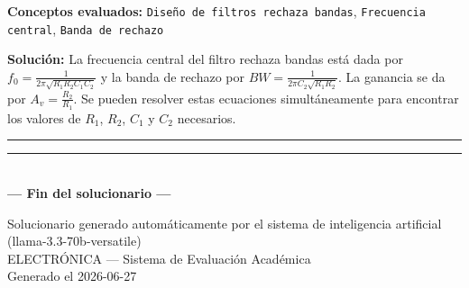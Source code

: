 \documentclass[11pt,a4paper]{article}
\begin{document}
\vspace{2mm}
\textbf{Conceptos evaluados:} \texttt{Diseño de filtros rechaza bandas}, \texttt{Frecuencia central}, \texttt{Banda de rechazo}

\vspace{2mm}
\textbf{Solución:}
La frecuencia central del filtro rechaza bandas está dada por $f_0 = \frac{1}{2\pi \sqrt{R_1 R_2 C_1 C_2}}$ y la banda de rechazo por $BW = \frac{1}{2\pi C_2 \sqrt{R_1 R_2}}$. La ganancia se da por $A_v = \frac{R_2}{R_1}$. Se pueden resolver estas ecuaciones simultáneamente para encontrar los valores de $R_1$, $R_2$, $C_1$ y $C_2$ necesarios.

\vspace{4pt}
\rule{\linewidth}{0.2pt}
\vspace{6pt}



\vspace{12pt}
\begin{center}
  \rule{0.6\linewidth}{0.4pt} \\[6pt]
  \textbf{--- Fin del solucionario ---}
\end{center}

\vfill
\begin{center}
  \footnotesize\color{gray}
  Solucionario generado automáticamente por el sistema de inteligencia artificial (llama-3.3-70b-versatile) \\
  ELECTRÓNICA --- Sistema de Evaluación Académica \\
  Generado el 2026-06-27
\end{center}
\end{document}
